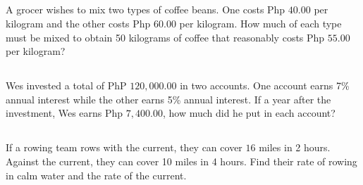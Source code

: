 


\subsection{} A grocer wishes to mix two types of coffee beans. One costs Php $40.00$
	per kilogram and the other costs Php $60.00$ per kilogram. How much of each type
	must be mixed to obtain 50 kilograms of coffee that reasonably costs Php $55.00$
	per kilogram?

\subsection{} Wes invested a total of PhP $120,000.00$ in two accounts. One account earns
	7\% annual interest while the other earns 5\% annual interest. If a year after the
	investment, Wes earns Php $7,400.00$, how much did he put in each account?

\subsection{} If a rowing team rows with the current, they can cover $16$ miles in 2 hours.
	Against the current, they can cover 10 miles in 4 hours. Find their rate of rowing in calm
	water and the rate of the current.

